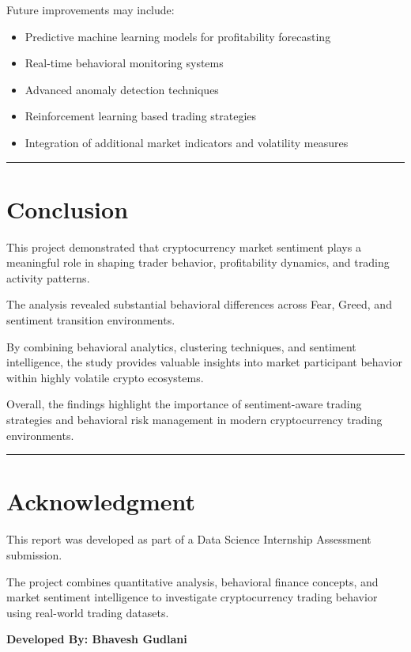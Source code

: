 \documentclass[11pt,a4paper]{article}
\begin{document}
Future improvements may include:

\begin{itemize}
    \item Predictive machine learning models for profitability forecasting

    \item Real-time behavioral monitoring systems

    \item Advanced anomaly detection techniques

    \item Reinforcement learning based trading strategies

    \item Integration of additional market indicators and volatility measures
\end{itemize}


\vspace{0.5cm}
\hrule
\vspace{0.3cm}

\section{Conclusion}

This project demonstrated that cryptocurrency market sentiment plays a meaningful role in shaping trader behavior, profitability dynamics, and trading activity patterns.

The analysis revealed substantial behavioral differences across Fear, Greed, and sentiment transition environments.

By combining behavioral analytics, clustering techniques, and sentiment intelligence, the study provides valuable insights into market participant behavior within highly volatile crypto ecosystems.

Overall, the findings highlight the importance of sentiment-aware trading strategies and behavioral risk management in modern cryptocurrency trading environments.


\vspace{0.5cm}
\hrule
\vspace{0.3cm}

\section*{Acknowledgment}

This report was developed as part of a Data Science Internship Assessment submission.

The project combines quantitative analysis, behavioral finance concepts, and market sentiment intelligence to investigate cryptocurrency trading behavior using real-world trading datasets.

\vspace{1cm}

\begin{center}
\textbf{Developed By: Bhavesh Gudlani}
\end{center}
\end{document}
